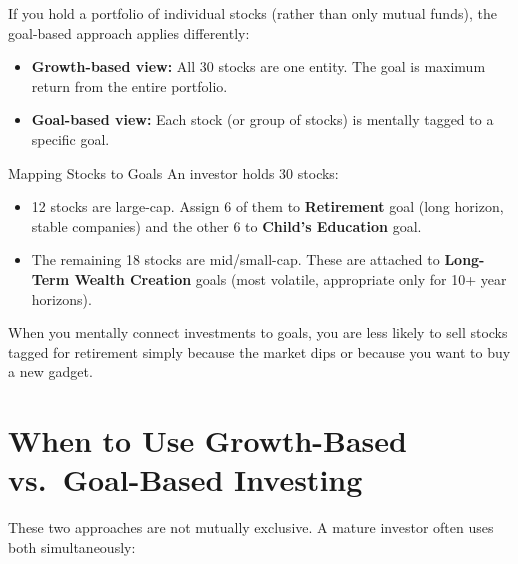 \documentclass[12pt,a4paper]{article}
\begin{document}
If you hold a portfolio of individual stocks (rather than only mutual funds), the goal-based approach applies differently:

\begin{itemize}
  \item \textbf{Growth-based view:} All 30 stocks are one entity. The goal is maximum return from the entire portfolio.
  \item \textbf{Goal-based view:} Each stock (or group of stocks) is mentally tagged to a specific goal.
\end{itemize}

\begin{examplebox}{Mapping Stocks to Goals}
An investor holds 30 stocks:
\begin{itemize}
  \item 12 stocks are large-cap. Assign 6 of them to \textbf{Retirement} goal (long horizon, stable companies) and the other 6 to \textbf{Child's Education} goal.
  \item The remaining 18 stocks are mid/small-cap. These are attached to \textbf{Long-Term Wealth Creation} goals (most volatile, appropriate only for 10+ year horizons).
\end{itemize}

When you mentally connect investments to goals, you are less likely to sell stocks tagged for retirement simply because the market dips or because you want to buy a new gadget.
\end{examplebox}

\section{When to Use Growth-Based vs.\ Goal-Based Investing}

These two approaches are not mutually exclusive. A mature investor often uses both simultaneously:
\end{document}
